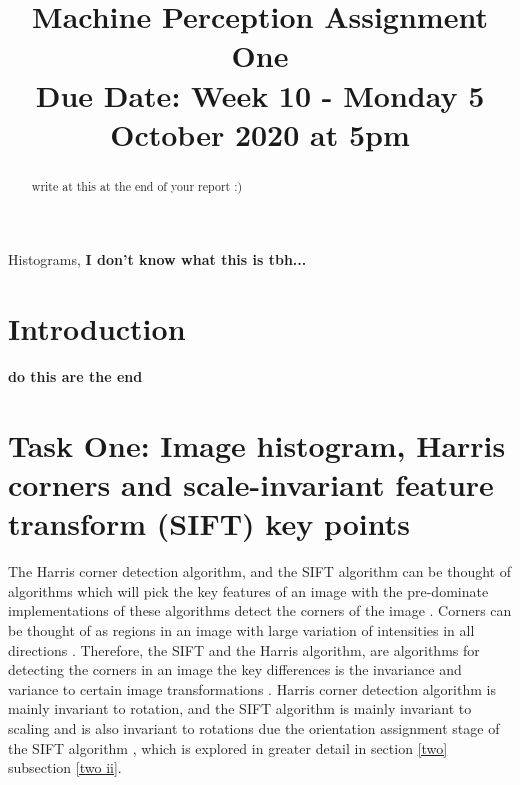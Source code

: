 \documentclass[conference]{IEEEtran}
\begin{document}
\title{Machine Perception Assignment One\\
{\footnotesize \textbf{Due Date:} Week 10 - Monday 5 October 2020 at 5pm}
}

\author{
}

\maketitle

\begin{abstract}
write at this at the end of your report :)
\end{abstract}

\begin{IEEEkeywords}
Histograms, \textbf{I don't know what this is tbh...}
\end{IEEEkeywords}

\section{Introduction}
\textbf{do this are the end}

\section{Task One: Image histogram, Harris corners and scale-invariant feature transform (SIFT) key points}\label{one}
The Harris corner detection algorithm, and the SIFT algorithm can be thought of algorithms which will pick the key features of an image with the pre-dominate implementations of these algorithms detect the corners of the image \cite{b2} \cite{b3}. Corners can be thought of as regions in an image with large variation of intensities in all directions \cite{b2}. Therefore, the SIFT and the Harris algorithm, are algorithms for detecting the corners in an image the key differences is the invariance and variance to certain image transformations \cite{b3}. Harris corner detection algorithm is mainly invariant to rotation, and the SIFT algorithm is mainly invariant to scaling and is also invariant to rotations due the orientation assignment stage of the SIFT algorithm \cite{b3}, which is explored in greater detail in section \ref{two} subsection \ref{two ii}.
\end{document}
